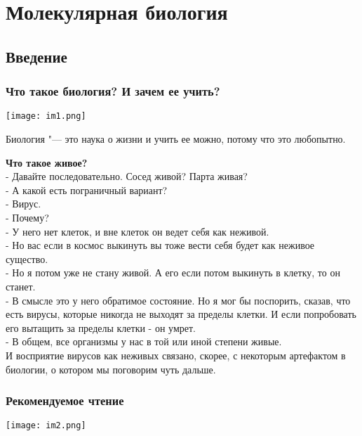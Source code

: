 ﻿\chapter{Молекулярная биология}
\section{Введение}
\subsection{Что такое биология? И зачем ее учить?}

\texttt{[image: im1.png]}

\begin{Def}
Биология "--- это наука о жизни и учить ее можно, потому что это любопытно.
\end{Def}

\textbf{Что такое живое?}\\

- Давайте последовательно. Сосед живой? Парта живая?\\

- А какой есть пограничный вариант? \\

- Вирус.\\ 

- Почему?\\ 

- У него нет клеток, и вне клеток он ведет себя как 
неживой. \\

- Но вас если в космос выкинуть вы тоже вести себя будет как 
неживое существо. \\

- Но я потом уже не стану живой. А его если потом
выкинуть в клетку, то он станет. \\

- В смысле это у него обратимое состояние. Но я
мог бы поспорить, сказав, что есть вирусы,
которые никогда не выходят за пределы клетки. И
если попробовать его вытащить за пределы клетки - он умрет.\\

- В общем, все организмы у нас в той или иной степени живые.\\ 
И восприятие вирусов как неживых связано, скорее, с некоторым артефактом
в биологии, о котором мы поговорим чуть дальше. \\

\subsection{Рекомендуемое чтение}
\texttt{[image: im2.png]}

